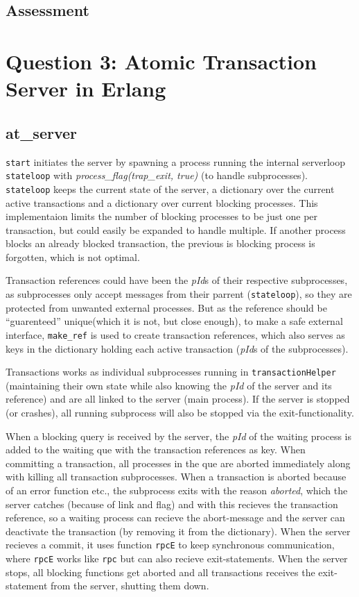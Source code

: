 \documentclass[a4paper, 10pt]{article}
\begin{document}
\subsection{Assessment}





\section{Question 3: Atomic Transaction Server in Erlang}
\subsection{at\_server}
\texttt{start} initiates the server by spawning a process running the internal serverloop \texttt{stateloop} with \textit{process\_flag(trap\_exit, true)} (to handle subprocesses). \texttt{stateloop} keeps the current state of the server, a dictionary over the current active transactions and a dictionary over current blocking processes. This implementaion limits the number of blocking processes to be just one per transaction, but could easily be expanded to handle multiple. If another process blocks an already blocked transaction, the previous is blocking process is forgotten, which is not optimal.

Transaction references could have been the \textit{pId}s of their respective subprocesses, as subprocesses only accept messages from their parrent (\texttt{stateloop}), so they are protected from unwanted external processes. But as the reference should be ``guarenteed'' unique(which it is not, but close enough), to make a safe external interface, \texttt{make\_ref} is used to create transaction references, which also serves as keys in the dictionary holding each active transaction (\textit{pId}s of the subprocesses).

Transactions works as individual subprocesses running in \texttt{transactionHelper} (maintaining their own state while also knowing the \textit{pId} of the server and its reference) and are all linked to the server (main process). If the server is stopped (or crashes), all running subprocess will also be stopped via the exit-functionality. 

When a blocking query is received by the server, the \textit{pId} of the waiting process is added to the waiting que with the transaction references as key. When committing a transaction, all processes in the que are aborted immediately along with killing all transaction subprocesses. When a transaction is aborted because of an error function etc., the subprocess exits with the reason \textit{aborted}, which the server catches (because of link and flag) and with this recieves the transaction reference, so a waiting process can recieve the abort-message and the server can deactivate the transaction (by removing it from the dictionary).
When the server recieves a commit, it uses function \texttt{rpcE} to keep synchronous communication, where \texttt{rpcE} works like \texttt{rpc} but can also recieve exit-statements.
When the server stops, all blocking functions get aborted and all transactions receives the exit-statement from the server, shutting them down.
\end{document}
